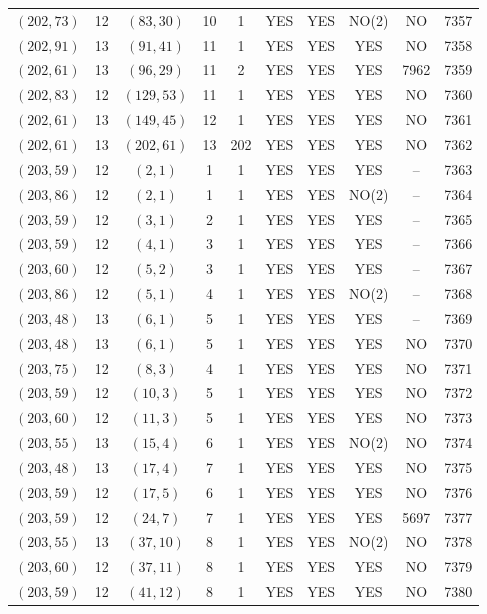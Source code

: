 \begin{longtable}{|c|c|c|c|c|c|c|c|c|c|}
$(202, 73)$ & 12 & $(83, 30)$ & 10 & 1 & YES & YES & NO(2) & NO & 7357\\
$(202, 91)$ & 13 & $(91, 41)$ & 11 & 1 & YES & YES & YES & NO & 7358\\
$(202, 61)$ & 13 & $(96, 29)$ & 11 & 2 & YES & YES & YES & 7962 & 7359\\
$(202, 83)$ & 12 & $(129, 53)$ & 11 & 1 & YES & YES & YES & NO & 7360\\
$(202, 61)$ & 13 & $(149, 45)$ & 12 & 1 & YES & YES & YES & NO & 7361\\
$(202, 61)$ & 13 & $(202, 61)$ & 13 & 202 & YES & YES & YES & NO & 7362\\
$(203, 59)$ & 12 & $(2, 1)$ & 1 & 1 & YES & YES & YES & -- & 7363\\
$(203, 86)$ & 12 & $(2, 1)$ & 1 & 1 & YES & YES & NO(2) & -- & 7364\\
$(203, 59)$ & 12 & $(3, 1)$ & 2 & 1 & YES & YES & YES & -- & 7365\\
$(203, 59)$ & 12 & $(4, 1)$ & 3 & 1 & YES & YES & YES & -- & 7366\\
$(203, 60)$ & 12 & $(5, 2)$ & 3 & 1 & YES & YES & YES & -- & 7367\\
$(203, 86)$ & 12 & $(5, 1)$ & 4 & 1 & YES & YES & NO(2) & -- & 7368\\
$(203, 48)$ & 13 & $(6, 1)$ & 5 & 1 & YES & YES & YES & -- & 7369\\
$(203, 48)$ & 13 & $(6, 1)$ & 5 & 1 & YES & YES & YES & NO & 7370\\
$(203, 75)$ & 12 & $(8, 3)$ & 4 & 1 & YES & YES & YES & NO & 7371\\
$(203, 59)$ & 12 & $(10, 3)$ & 5 & 1 & YES & YES & YES & NO & 7372\\
$(203, 60)$ & 12 & $(11, 3)$ & 5 & 1 & YES & YES & YES & NO & 7373\\
$(203, 55)$ & 13 & $(15, 4)$ & 6 & 1 & YES & YES & NO(2) & NO & 7374\\
$(203, 48)$ & 13 & $(17, 4)$ & 7 & 1 & YES & YES & YES & NO & 7375\\
$(203, 59)$ & 12 & $(17, 5)$ & 6 & 1 & YES & YES & YES & NO & 7376\\
$(203, 59)$ & 12 & $(24, 7)$ & 7 & 1 & YES & YES & YES & 5697 & 7377\\
$(203, 55)$ & 13 & $(37, 10)$ & 8 & 1 & YES & YES & NO(2) & NO & 7378\\
$(203, 60)$ & 12 & $(37, 11)$ & 8 & 1 & YES & YES & YES & NO & 7379\\
$(203, 59)$ & 12 & $(41, 12)$ & 8 & 1 & YES & YES & YES & NO & 7380\\

\end{longtable}
